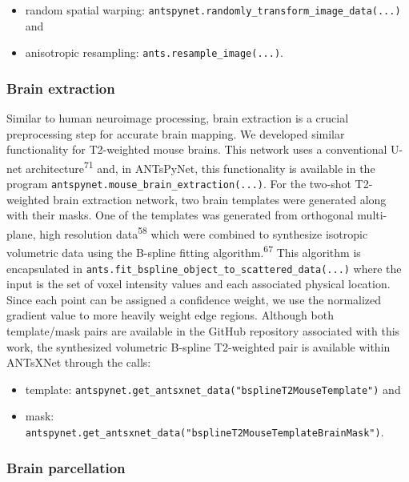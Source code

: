 \documentclass[
  12pt,
]{article}
\begin{document}
\begin{itemize}
\item
  random spatial warping:
  \texttt{antspynet.randomly\_transform\_image\_data(...)} and
\item
  anisotropic resampling: \texttt{ants.resample\_image(...)}.
\end{itemize}

\hypertarget{brain-extraction}{%
\subsubsection{Brain extraction}\label{brain-extraction}}

Similar to human neuroimage processing, brain extraction is a crucial
preprocessing step for accurate brain mapping. We developed similar
functionality for T2-weighted mouse brains. This network uses a
conventional U-net architecture\textsuperscript{71} and, in ANTsPyNet,
this functionality is available in the program
\texttt{antspynet.mouse\_brain\_extraction(...)}. For the two-shot
T2-weighted brain extraction network, two brain templates were generated
along with their masks. One of the templates was generated from
orthogonal multi-plane, high resolution data\textsuperscript{58} which
were combined to synthesize isotropic volumetric data using the B-spline
fitting algorithm.\textsuperscript{67} This algorithm is encapsulated in
\texttt{ants.fit\_bspline\_object\_to\_scattered\_data(...)} where the
input is the set of voxel intensity values and each associated physical
location. Since each point can be assigned a confidence weight, we use
the normalized gradient value to more heavily weight edge regions.
Although both template/mask pairs are available in the GitHub repository
associated with this work, the synthesized volumetric B-spline
T2-weighted pair is available within ANTsXNet through the calls:

\begin{itemize}
\item
  template:
  \texttt{antspynet.get\_antsxnet\_data("bsplineT2MouseTemplate")} and
\item
  mask:
  \texttt{antspynet.get\_antsxnet\_data("bsplineT2MouseTemplateBrainMask")}.
\end{itemize}

\hypertarget{brain-parcellation}{%
\subsubsection{Brain parcellation}\label{brain-parcellation}}
\end{document}
